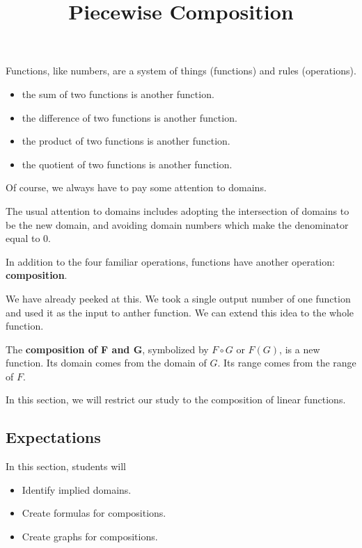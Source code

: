 \documentclass{ximera}
\title{Piecewise Composition}
\begin{document}
\begin{abstract}
\end{abstract}
\maketitle




Functions, like numbers, are a system of things (functions) and rules (operations).  

\begin{itemize}
\item the sum of two functions is another function.
\item the difference of two functions is another function.
\item the product of two functions is another function.
\item the quotient of two functions is another function.
\end{itemize}

Of course, we always have to pay some attention to domains.



The usual attention to domains includes adopting the intersection of domains to be the new domain, and avoiding domain numbers which make the denominator equal to $0$.



In addition to the four familiar operations, functions have another operation: \textbf{composition}.

We have already peeked at this. We took a single output number of one function and used it as the input to anther function.  We can extend this idea to the whole function.


The \textbf{composition of F and G}, symbolized by $F \circ G$ or $F(G)$, is a new function.  Its domain comes from the domain of $G$. Its range comes from the range of $F$.



In this section, we will restrict our study to the composition of linear functions.














\subsection{Expectations}



\begin{sectionOutcomes}
In this section, students will 

\begin{itemize}
\item Identify implied domains.
\item Create formulas for compositions.
\item Create graphs for compositions.
\end{itemize}
\end{sectionOutcomes}
\end{document}
